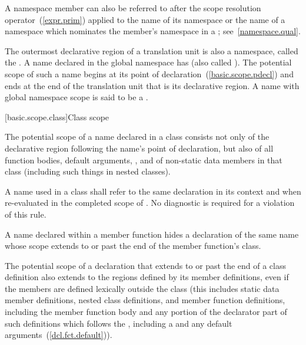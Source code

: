 \pnum
A namespace member can also be referred to after the \tcode{::} scope
resolution operator~(\ref{expr.prim}) applied to the name of its
namespace or the name of a namespace which nominates the member's
namespace in a ; see~\ref{namespace.qual}.

\pnum
{}%
%
The outermost declarative region of a translation unit is also a
namespace, called the . A name declared in
the global namespace has  (also called
). The potential scope of such a name begins at
its point of declaration~(\ref{basic.scope.pdecl}) and ends at the end
of the translation unit that is its declarative region.
%
A name with global namespace scope is said to be a
.

[basic.scope.class]{Class scope}
%

\pnum
The potential scope of a name declared in a class consists not
only of the declarative region following the name's point of
declaration, but also of all function bodies, default arguments,
, and
 of non-static data members
in that class (including such
things in nested classes).

\pnum
A name  used in a class  shall refer to the same
declaration in its context and when re-evaluated in the completed scope
of . No diagnostic is required for a violation of this rule.

\pnum
A name declared within a member function hides a declaration of
the same name whose scope extends to or past the end of the member
function's class.

\pnum
The potential scope of a declaration that extends to or past the
end of a class definition also extends to the regions defined by its
member definitions, even if the members are defined lexically outside
the class (this includes static data member definitions, nested class
definitions, and member function definitions, including the member function
body and any portion of the
declarator part of such definitions which follows the ,
including a  and any default
arguments~(\ref{dcl.fct.default})).

